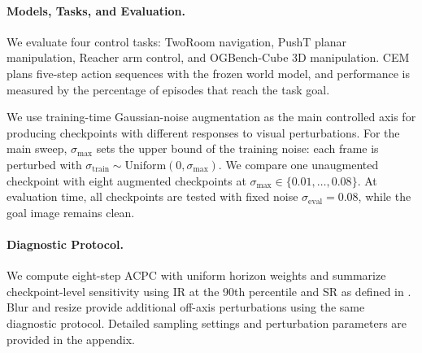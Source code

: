 

\paragraph{Models, Tasks, and Evaluation.}
We evaluate four control tasks: TwoRoom navigation, PushT planar manipulation,
Reacher arm control, and OGBench-Cube 3D manipulation. CEM plans five-step
action sequences with the frozen world model, and performance is measured by
the percentage of episodes that reach the task goal.

We use training-time Gaussian-noise augmentation as the main controlled axis
for producing checkpoints with different responses to visual perturbations.
For the main sweep, $\sigma_{\max}$ sets the upper bound of the training noise:
each frame is perturbed with
$\sigma_{\mathrm{train}}\sim\mathrm{Uniform}(0,\sigma_{\max})$.
We compare one unaugmented checkpoint with eight augmented checkpoints at
$\sigma_{\max}\in\{0.01,\ldots,0.08\}$. At evaluation time, all checkpoints
are tested with fixed noise $\sigma_{\mathrm{eval}}=0.08$, while the goal
image remains clean.

\paragraph{Diagnostic Protocol.}
We compute eight-step ACPC with uniform horizon weights and summarize
checkpoint-level sensitivity using IR at the 90th percentile and SR as defined
in . Blur and resize provide additional off-axis
perturbations using the same diagnostic protocol. Detailed sampling settings
and perturbation parameters are provided in the appendix.


